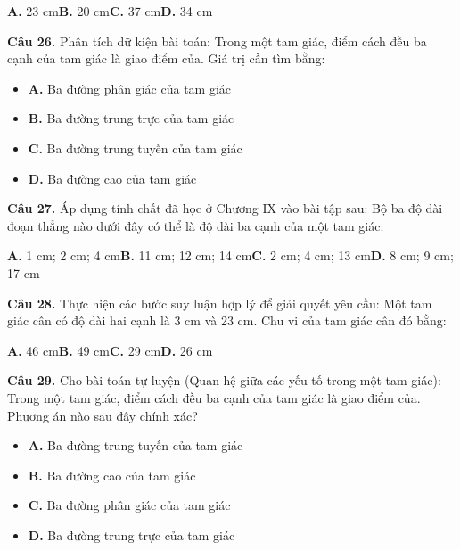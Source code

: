 \documentclass[11pt,a4paper]{article}
\begin{document}
\hspace*{1.5em}\textbf{A.} 23 cm\quad\quad \textbf{B.} 20 cm\quad\quad \textbf{C.} 37 cm\quad\quad \textbf{D.} 34 cm\par\vspace{2pt}
\textbf{\color{primary} Câu 26.} Phân tích dữ kiện bài toán: Trong một tam giác, điểm cách đều ba cạnh của tam giác là giao điểm của. Giá trị cần tìm bằng:\par
\begin{itemize}\setlength{\itemsep}{1pt}\setlength{\parskip}{0pt}
  \item[] \textbf{A.} Ba đường phân giác của tam giác
  \item[] \textbf{B.} Ba đường trung trực của tam giác
  \item[] \textbf{C.} Ba đường trung tuyến của tam giác
  \item[] \textbf{D.} Ba đường cao của tam giác
\end{itemize}\vspace{2pt}
\textbf{\color{primary} Câu 27.} Áp dụng tính chất đã học ở Chương IX vào bài tập sau: Bộ ba độ dài đoạn thẳng nào dưới đây có thể là độ dài ba cạnh của một tam giác:\par
\hspace*{1.5em}\textbf{A.} 1 cm; 2 cm; 4 cm\quad\quad \textbf{B.} 11 cm; 12 cm; 14 cm\quad\quad \textbf{C.} 2 cm; 4 cm; 13 cm\quad\quad \textbf{D.} 8 cm; 9 cm; 17 cm\par\vspace{2pt}
\textbf{\color{primary} Câu 28.} Thực hiện các bước suy luận hợp lý để giải quyết yêu cầu: Một tam giác cân có độ dài hai cạnh là 3 cm và 23 cm. Chu vi của tam giác cân đó bằng:\par
\hspace*{1.5em}\textbf{A.} 46 cm\quad\quad \textbf{B.} 49 cm\quad\quad \textbf{C.} 29 cm\quad\quad \textbf{D.} 26 cm\par\vspace{2pt}
\textbf{\color{primary} Câu 29.} Cho bài toán tự luyện (Quan hệ giữa các yếu tố trong một tam giác): Trong một tam giác, điểm cách đều ba cạnh của tam giác là giao điểm của. Phương án nào sau đây chính xác?\par
\begin{itemize}\setlength{\itemsep}{1pt}\setlength{\parskip}{0pt}
  \item[] \textbf{A.} Ba đường trung tuyến của tam giác
  \item[] \textbf{B.} Ba đường cao của tam giác
  \item[] \textbf{C.} Ba đường phân giác của tam giác
  \item[] \textbf{D.} Ba đường trung trực của tam giác
\end{itemize}\vspace{2pt}
\end{document}
